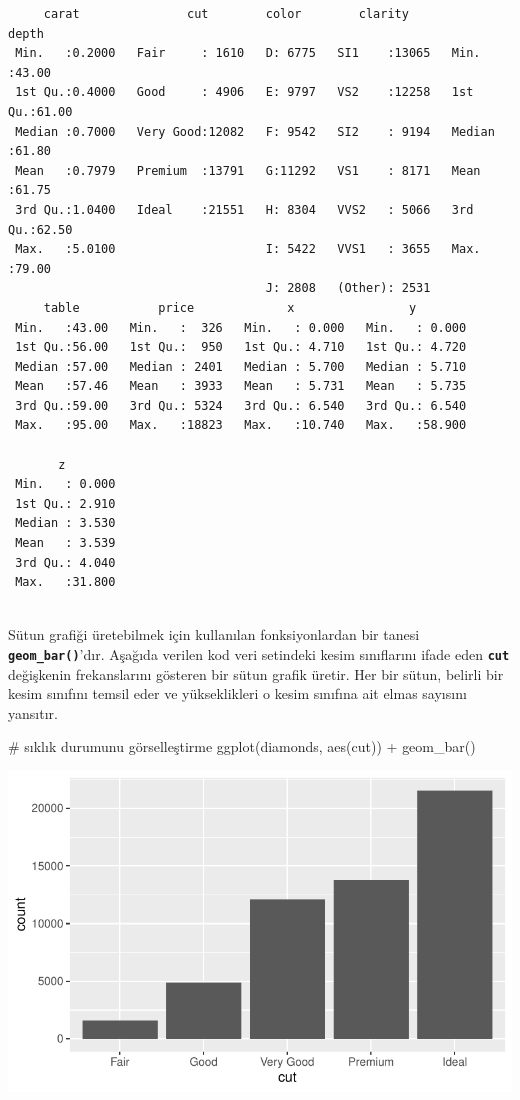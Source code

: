 \documentclass[
  letterpaper,
  DIV=11,
  numbers=noendperiod]{scrreprt}
\newenvironment{Shaded}{\begin{snugshade}}{\end{snugshade}}
\newcommand{\CommentTok}[1]{\textcolor[rgb]{0.37,0.37,0.37}{#1}}
\newcommand{\FunctionTok}[1]{\textcolor[rgb]{0.28,0.35,0.67}{#1}}
\newcommand{\NormalTok}[1]{\textcolor[rgb]{0.00,0.23,0.31}{#1}}
\newcommand{\SpecialCharTok}[1]{\textcolor[rgb]{0.37,0.37,0.37}{#1}}
\begin{document}
\begin{verbatim}
     carat               cut        color        clarity          depth      
 Min.   :0.2000   Fair     : 1610   D: 6775   SI1    :13065   Min.   :43.00  
 1st Qu.:0.4000   Good     : 4906   E: 9797   VS2    :12258   1st Qu.:61.00  
 Median :0.7000   Very Good:12082   F: 9542   SI2    : 9194   Median :61.80  
 Mean   :0.7979   Premium  :13791   G:11292   VS1    : 8171   Mean   :61.75  
 3rd Qu.:1.0400   Ideal    :21551   H: 8304   VVS2   : 5066   3rd Qu.:62.50  
 Max.   :5.0100                     I: 5422   VVS1   : 3655   Max.   :79.00  
                                    J: 2808   (Other): 2531                  
     table           price             x                y         
 Min.   :43.00   Min.   :  326   Min.   : 0.000   Min.   : 0.000  
 1st Qu.:56.00   1st Qu.:  950   1st Qu.: 4.710   1st Qu.: 4.720  
 Median :57.00   Median : 2401   Median : 5.700   Median : 5.710  
 Mean   :57.46   Mean   : 3933   Mean   : 5.731   Mean   : 5.735  
 3rd Qu.:59.00   3rd Qu.: 5324   3rd Qu.: 6.540   3rd Qu.: 6.540  
 Max.   :95.00   Max.   :18823   Max.   :10.740   Max.   :58.900  
                                                                  
       z         
 Min.   : 0.000  
 1st Qu.: 2.910  
 Median : 3.530  
 Mean   : 3.539  
 3rd Qu.: 4.040  
 Max.   :31.800  
                 
\end{verbatim}

Sütun grafiği üretebilmek için kullanılan fonksiyonlardan bir tanesi
\textbf{\texttt{geom\_bar()}}'dır. Aşağıda verilen kod veri setindeki
kesim sınıflarını ifade eden \textbf{\texttt{cut}} değişkenin
frekanslarını gösteren bir sütun grafik üretir. Her bir sütun, belirli
bir kesim sınıfını temsil eder ve yükseklikleri o kesim sınıfına ait
elmas sayısını yansıtır.

\begin{Shaded}
\begin{Highlighting}[]
\CommentTok{\# sıklık durumunu görselleştirme}
\FunctionTok{ggplot}\NormalTok{(diamonds, }\FunctionTok{aes}\NormalTok{(cut)) }\SpecialCharTok{+}
  \FunctionTok{geom\_bar}\NormalTok{()}
\end{Highlighting}
\end{Shaded}

\includegraphics{ggplot2_files/figure-pdf/unnamed-chunk-15-1.pdf}
\end{document}
